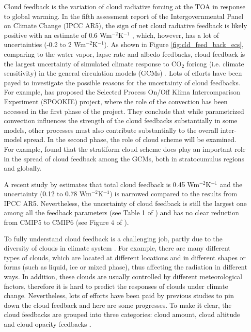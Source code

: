 Cloud feedback is the variation of cloud radiative forcing at the TOA in response to global warming. In the fifth assessment report of the Intergovernmental Panel on Climate Change (IPCC AR5), the sign of net cloud radiative feedback is likely positive with an estimate of 0.6 Wm$^{-2}$K$^{-1}$ \citep{Stocker2013}, which, however, has a lot of uncertainties (-0.2 to 2 Wm$^{-2}$K$^{-1}$). As shown in Figure \ref{fig:cld_feed_back_ecs}, comparing to the water vapor, lapse rate and albedo feedbacks, cloud feedback is the largest uncertainty of simulated climate response to CO$_2$ foricng (i.e. climate sensitivity) in the general circulation models (GCMs) \citep{Ceppi2017}. Lots of efforts have been payed to investigate the possible reasons for the uncertainty of cloud feedbacks. For example, \cite{Webb2015} has proposed the Selected Process On/Off Klima Intercomparison Experiment (SPOOKIE) project, where the role of the convection has been accessed in the first phase of the project. They conclude that while parametrized convection influences the strength of the cloud feedbacks substantially in some models, other processes must also contribute substantially to the overall inter-model spread. In the second phase, the role of cloud scheme will be examined. For example, \cite{Geoffroy2017} found that the stratiform cloud scheme does play an important role in the spread of cloud feedback among the GCMs, both in stratocumulus regions and globally.


A recent study by \cite{Sherwood2020} estimates that total cloud feedback is 0.45 Wm$^{-2}$K$^{-1}$ and the uncertainty (0.12 to 0.78 Wm$^{-2}$K$^{-1}$) is narrowed compared to the results from IPCC AR5. Nevertheless, the uncertainty of cloud feedback is still the largest one among all the feedback parameters (see Table 1 of \citealt{Sherwood2020}) and has no clear reduction from CMIP5 to CMIP6 (see Figure 4 of \citealt{Sherwood2020}).

To fully understand cloud feedback is a challenging job, partly due to the diversity of clouds in climate system \citep{Zelinka2017}. For example, there are many different types of clouds, which are located at different locations and in different shapes or forms (such as liquid, ice or mixed phase), thus affecting the radiation in different ways. In addition, these clouds are usually controlled by different meteorological factors, therefore it is hard to predict the responses of clouds under climate change. Nevertheless, lots of efforts have been paid by previous studies to pin down the cloud feedback and here are some progresses. To make it clear, the cloud feedbacks are grouped into three categories: cloud amount, cloud altitude and cloud opacity feedbacks \citep{Zelinka2017}.

